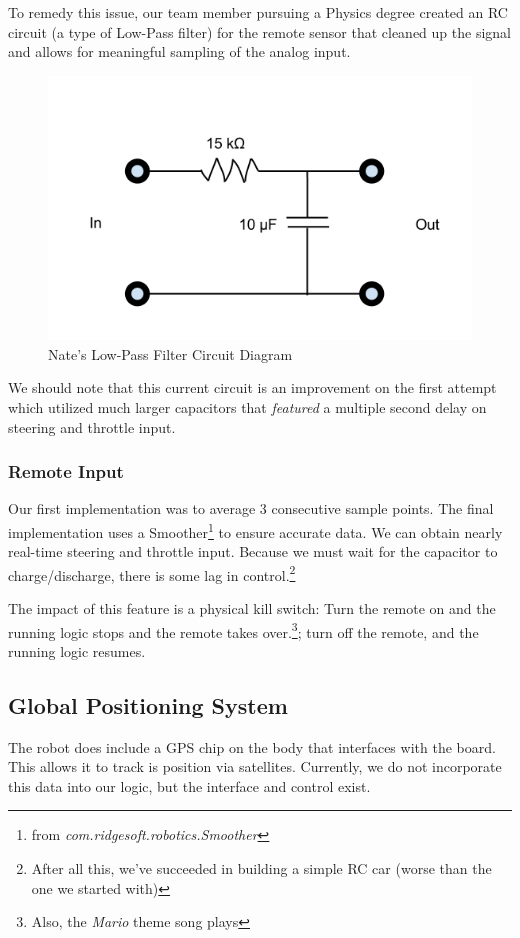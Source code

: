 \documentclass[12pt]{article}
\begin{document}
To remedy this issue, our team member pursuing a Physics degree created an RC circuit (a type of Low-Pass filter) for the remote sensor that cleaned up the signal and allows for meaningful sampling of the analog input.  
\begin{figure}[h]
\centerline{\includegraphics[scale=.5]{img/circuit}}
\caption{Nate's Low-Pass Filter Circuit Diagram}
\end{figure}

We should note that this current circuit is an improvement on the first attempt which utilized much larger capacitors that \textit{featured} a multiple second delay on steering and throttle input.

\subsubsection*{Remote Input}
Our first implementation was to average 3 consecutive sample points.  The final implementation uses a Smoother\footnote{from \textit{com.ridgesoft.robotics.Smoother}} to ensure accurate data.  We can obtain nearly real-time steering and throttle input.  Because we must wait for the capacitor to charge/discharge, there is some lag in control.\footnote{After all this, we've succeeded in building a simple RC car (worse than the one we started with)}

The impact of this feature is a physical kill switch: Turn the remote on and the running logic stops and the remote takes over.\footnote{Also, the \textit{Mario} theme song plays}; turn off the remote, and the running logic resumes.


\clearpage
\subsection{Global Positioning System}
The robot does include a GPS chip on the body that interfaces with the board.  This allows it to track is position via satellites.  Currently, we do not incorporate this data into our logic, but the interface and control exist.
\end{document}
